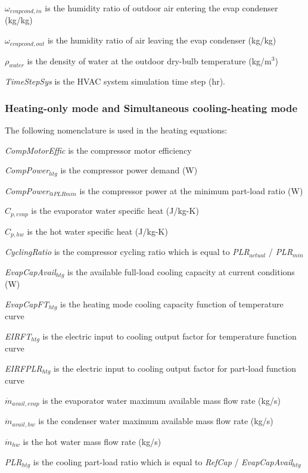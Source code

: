 \({\omega_{evapcond,in}}\) is the humidity ratio of outdoor air entering the evap condenser (kg/kg)

\({\omega_{evapcond,out}}\) is the humidity ratio of air leaving the evap condenser (kg/kg)

\({\rho_{water}}\) is the density of water at the outdoor dry-bulb temperature (kg/m\(^{3}\))

\emph{TimeStepSys} is the HVAC system simulation time step (hr).


\subsubsection{Heating-only mode and Simultaneous cooling-heating mode}\label{heating-only-mode-and-simultaneous-cooling-heating-mode}

The following nomenclature is used in the heating equations:

\emph{CompMotorEffic} is the compressor motor efficiency

\emph{CompPower\(_{htg}\)} is the compressor power demand (W)

\emph{CompPower\(_{@PLRmin}\)} is the compressor power at the minimum part-load ratio (W)

\({C_{p,evap}}\) is the evaporator water specific heat (J/kg-K)

\({C_{p,hw}}\) is the hot water specific heat (J/kg-K)

\emph{CyclingRatio} is the compressor cycling ratio which is equal to \emph{PLR\(_{actual}\)} / \emph{PLR\(_{min}\)}

\emph{EvapCapAvail\(_{htg}\)} is the available full-load cooling capacity at current conditions (W)

\emph{EvapCapFT\(_{htg}\)} is the heating mode cooling capacity function of temperature curve

\emph{EIRFT\(_{htg}\)} is the electric input to cooling output factor for temperature function curve

\emph{EIRFPLR\(_{htg}\)} is the electric input to cooling output factor for part-load function curve

\({\dot m_{avail,evap}}\) is the evaporator water maximum available mass flow rate (kg/s)

\({\dot m_{avail,hw}}\) is the condenser water maximum available mass flow rate (kg/s)

\({\dot m_{hw}}\) is the hot water mass flow rate (kg/s)

\emph{PLR\(_{htg}\)} is the cooling part-load ratio which is equal to \emph{RefCap} / \emph{EvapCapAvail\(_{htg}\)}

